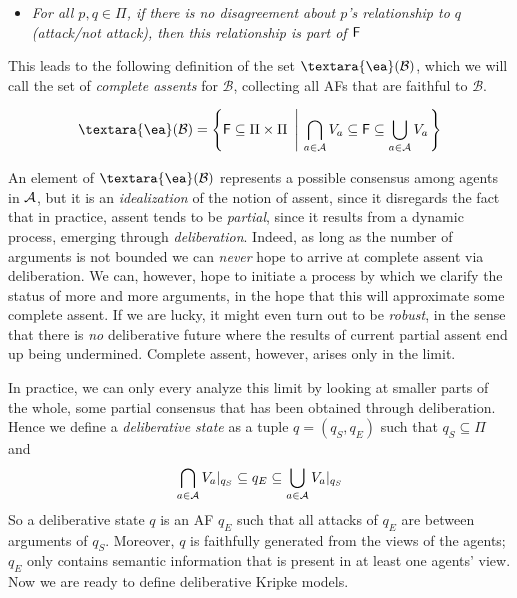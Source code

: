\documentclass{article}
\newcommand{\cons}[1]{{\textara{\ea}}(#1)}
\newcommand{\af}{{\sf F}}
\newcommand{\views}{\mathcal B}
\begin{document}
{\begin{itemize}
\item \emph{For all $p,q \in \Pi$, if there is no disagreement about $p$'s relationship to $q$ (attack/not attack), then this relationship is part of $\af$}
\end{itemize}

This leads to the following definition of the set $\cons \views$, which we will call the set of \emph{complete assents} for $\views$, collecting all AFs that are faithful to $\views$.

\begin{equation}\label{def:consensus}
\cons \views = \left\{\af \subseteq \Pi \times \Pi ~\left|~ \bigcap_{a \in \agents}V_a \subseteq \af \subseteq \bigcup_{a \in \agents}V_a\right.\right\}
\end{equation}

An element of $\cons \views$ represents a possible consensus among agents in $\mathcal A$, but it is an \emph{idealization} of the notion of assent, since it disregards the fact that in practice, assent tends to be \emph{partial}, since it results from a dynamic process, emerging through \emph{deliberation}. Indeed, as long as the number of arguments is not bounded we can \emph{never} hope to arrive at complete assent via deliberation. We can, however, hope to initiate a process by which we clarify the status of more and more arguments, in the hope that this will approximate some complete assent. If we are lucky, it might even turn out to be \emph{robust}, in the sense that there is \emph{no} deliberative future where the results of current partial assent end up being undermined. Complete assent, however, arises only in the limit.

In practice, we can only every analyze this limit by looking at smaller parts of the whole, some partial consensus that has been obtained through deliberation. Hence we define a \emph{deliberative state} as a tuple $q = (q_S,q_E)$ such that $q_S \subseteq \Pi$ and 
\begin{equation}\label{eq:ds}
\bigcap_{a \in \mathcal A}{V_a}|_{q_S} \subseteq q_E \subseteq \bigcup_{a\in \mathcal A} {V_a}|_{q_S}
\end{equation}
So a deliberative state $q$ is an AF $q_E$ such that all attacks of $q_E$ are between arguments of $q_S$. Moreover, $q$ is faithfully generated from the views of the agents; $q_E$ only contains semantic information that is present in at least one agents' view. Now we are ready to define deliberative Kripke models.

}
\end{document}
